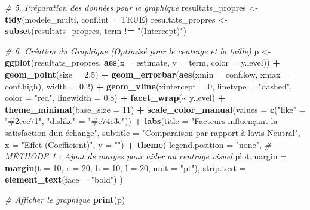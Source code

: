 \documentclass[mstat,12pt]{unswthesis}
\newenvironment{Shaded}{\begin{snugshade}}{\end{snugshade}}
\newcommand{\AttributeTok}[1]{\textcolor[rgb]{0.13,0.29,0.53}{#1}}
\newcommand{\CommentTok}[1]{\textcolor[rgb]{0.56,0.35,0.01}{\textit{#1}}}
\newcommand{\ConstantTok}[1]{\textcolor[rgb]{0.56,0.35,0.01}{#1}}
\newcommand{\DecValTok}[1]{\textcolor[rgb]{0.00,0.00,0.81}{#1}}
\newcommand{\FloatTok}[1]{\textcolor[rgb]{0.00,0.00,0.81}{#1}}
\newcommand{\FunctionTok}[1]{\textcolor[rgb]{0.13,0.29,0.53}{\textbf{#1}}}
\newcommand{\NormalTok}[1]{#1}
\newcommand{\OtherTok}[1]{\textcolor[rgb]{0.56,0.35,0.01}{#1}}
\newcommand{\SpecialCharTok}[1]{\textcolor[rgb]{0.81,0.36,0.00}{\textbf{#1}}}
\newcommand{\StringTok}[1]{\textcolor[rgb]{0.31,0.60,0.02}{#1}}
\begin{document}
\begin{Shaded}
\begin{Highlighting}[]
\CommentTok{\# 5. Préparation des données pour le graphique}
\NormalTok{resultats\_propres }\OtherTok{\textless{}{-}} \FunctionTok{tidy}\NormalTok{(modele\_multi, }\AttributeTok{conf.int =} \ConstantTok{TRUE}\NormalTok{)}
\NormalTok{resultats\_propres }\OtherTok{\textless{}{-}} \FunctionTok{subset}\NormalTok{(resultats\_propres, term }\SpecialCharTok{!=} \StringTok{"(Intercept)"}\NormalTok{)}

\CommentTok{\# 6. Création du Graphique (Optimisé pour le centrage et la taille)}
\NormalTok{p }\OtherTok{\textless{}{-}} \FunctionTok{ggplot}\NormalTok{(resultats\_propres, }\FunctionTok{aes}\NormalTok{(}\AttributeTok{x =}\NormalTok{ estimate, }\AttributeTok{y =}\NormalTok{ term, }\AttributeTok{color =}\NormalTok{ y.level)) }\SpecialCharTok{+}
  \FunctionTok{geom\_point}\NormalTok{(}\AttributeTok{size =} \FloatTok{2.5}\NormalTok{) }\SpecialCharTok{+} 
  \FunctionTok{geom\_errorbar}\NormalTok{(}\FunctionTok{aes}\NormalTok{(}\AttributeTok{xmin =}\NormalTok{ conf.low, }\AttributeTok{xmax =}\NormalTok{ conf.high), }\AttributeTok{width =} \FloatTok{0.2}\NormalTok{) }\SpecialCharTok{+} 
  \FunctionTok{geom\_vline}\NormalTok{(}\AttributeTok{xintercept =} \DecValTok{0}\NormalTok{, }\AttributeTok{linetype =} \StringTok{"dashed"}\NormalTok{, }\AttributeTok{color =} \StringTok{"red"}\NormalTok{,}
  \AttributeTok{linewidth =} \FloatTok{0.8}\NormalTok{) }\SpecialCharTok{+} 
  \FunctionTok{facet\_wrap}\NormalTok{(}\SpecialCharTok{\textasciitilde{}}\NormalTok{ y.level) }\SpecialCharTok{+} 
  \FunctionTok{theme\_minimal}\NormalTok{(}\AttributeTok{base\_size =} \DecValTok{11}\NormalTok{) }\SpecialCharTok{+}
  \FunctionTok{scale\_color\_manual}\NormalTok{(}\AttributeTok{values =} \FunctionTok{c}\NormalTok{(}\StringTok{"like"} \OtherTok{=} \StringTok{"\#2ecc71"}\NormalTok{, }\StringTok{"dislike"} \OtherTok{=} \StringTok{"\#e74c3c"}\NormalTok{)) }\SpecialCharTok{+}
  \FunctionTok{labs}\NormalTok{(}\AttributeTok{title =} \StringTok{"Facteurs influençant la satisfaction d\textquotesingle{}un échange"}\NormalTok{,}
       \AttributeTok{subtitle =} \StringTok{"Comparaison par rapport à l\textquotesingle{}avis \textquotesingle{}Neutral\textquotesingle{}"}\NormalTok{,}
       \AttributeTok{x =} \StringTok{"Effet (Coefficient)"}\NormalTok{,}
       \AttributeTok{y =} \StringTok{""}\NormalTok{) }\SpecialCharTok{+}
  \FunctionTok{theme}\NormalTok{(}
    \AttributeTok{legend.position =} \StringTok{"none"}\NormalTok{,}
    \CommentTok{\# MÉTHODE 1 : Ajout de marges pour aider au centrage visuel}
    \AttributeTok{plot.margin =} \FunctionTok{margin}\NormalTok{(}\AttributeTok{t =} \DecValTok{10}\NormalTok{, }\AttributeTok{r =} \DecValTok{20}\NormalTok{, }\AttributeTok{b =} \DecValTok{10}\NormalTok{, }\AttributeTok{l =} \DecValTok{20}\NormalTok{, }\AttributeTok{unit =} \StringTok{"pt"}\NormalTok{),}
    \AttributeTok{strip.text =} \FunctionTok{element\_text}\NormalTok{(}\AttributeTok{face =} \StringTok{"bold"}\NormalTok{)}
\NormalTok{  )}

\CommentTok{\# Afficher le graphique}
\FunctionTok{print}\NormalTok{(p)}
\end{Highlighting}
\end{Shaded}
\end{document}
